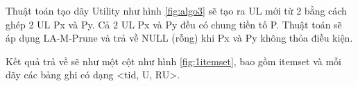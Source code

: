 Thuật toán tạo dãy Utility như hình \ref{fig:algo3} sẽ tạo ra UL mới từ 2 bằng cách ghép 2 UL Px và Py. Cả 2 UL Px và Py đều có chung tiền tố P. Thuật toán sẽ áp dụng LA-M-Prune và trả về NULL (rỗng) khi Px và Py không thỏa điều kiện. 

Kết quả trả về sẽ như một cột như hình \ref{fig:1itemset}, bao gồm itemset và mỗi dãy các bảng ghi có dạng <tid, U, RU>. 

